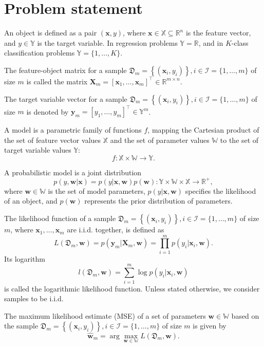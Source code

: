 \documentclass[
11pt,%
tightenlines,%
twoside,%
onecolumn,%
nofloats,%
nobibnotes,%
nofootinbib,%
superscriptaddress,%
noshowpacs,%
centertags]%
{revtex4-2}
\begin{document}
\section{Problem statement}

An object is defined as a pair $(\mathbf{x}, y)$, where $\mathbf{x} \in \mathbb{X} \subseteq \mathbb{R}^n$ is the feature vector, and $y \in \mathbb{Y}$ is the target variable. In regression problems $\mathbb{Y} = \mathbb{R}$, and in $K$-class classification problems $\mathbb{Y} = \{1, \ldots, K\}$.

The feature-object matrix for a sample $\mathfrak{D}_m = \left\{ (\mathbf{x}_i, y_i) \right\}, i \in \mathcal{I} = \{ 1, \ldots, m \}$ of size $m$ is called the matrix $\mathbf{X}_m = \left[ \mathbf{x}_1, \ldots, \mathbf{x}_m \right]^{\top} \in \mathbb{R}^{m \times n}$.

The target variable vector for a sample $\mathfrak{D}_m = \left\{ (\mathbf{x}_i, y_i) \right\}, i \in \mathcal{I} = \{ 1, \ldots, m \}$ of size $m$ is denoted by $\mathbf{y}_m = \left[ y_1, \ldots, y_m \right]^{\top} \in \mathbb{Y}^m$.

A model is a parametric family of functions $f$, mapping the Cartesian product of the set of feature vector values $\mathbb{X}$ and the set of parameter values $\mathbb{W}$ to the set of target variable values $\mathbb{Y}$: 
\[ f: \mathbb{X} \times \mathbb{W} \to \mathbb{Y}. \]

A probabilistic model is a joint distribution
\[ p(y, \mathbf{w} | \mathbf{x}) = p(y | \mathbf{x}, \mathbf{w}) p(\mathbf{w}): \mathbb{Y} \times \mathbb{W} \times \mathbb{X} \to \mathbb{R}^+, \]
where $\mathbf{w} \in \mathbb{W}$ is the set of model parameters, $p(y | \mathbf{x}, \mathbf{w})$ specifies the likelihood of an object, and $p(\mathbf{w})$ represents the prior distribution of parameters.

The likelihood function of a sample $\mathfrak{D}_m = \left\{ (\mathbf{x}_i, y_i) \right\}, i \in \mathcal{I} = \{ 1, \ldots, m \}$ of size $m$, where $\mathbf{x}_1, \ldots, \mathbf{x}_m$ are i.i.d. together, is defined as 
\[ L(\mathfrak{D}_m, \mathbf{w}) = p(\mathbf{y}_m | \mathbf{X}_m, \mathbf{w}) = \prod_{i=1}^{m} p(y_i | \mathbf{x}_i, \mathbf{w}). \]
Its logarithm
\[ l(\mathfrak{D}_m, \mathbf{w}) = \sum\limits_{i=1}^{m} \log p(y_i | \mathbf{x}_i, \mathbf{w}) \]
is called the logarithmic likelihood function. Unless stated otherwise, we consider samples to be i.i.d.

The maximum likelihood estimate (MSE) of a set of parameters $\mathbf{w} \in \mathbb{W}$ based on the sample $\mathfrak{D}_m = \left\{ (\mathbf{x}_i, y_i) \right\}, i \in \mathcal{I} = \{ 1, \ldots, m \}$ of size $m$ is given by 
\[ \hat{\mathbf{w}}_{m} = \arg\max_{\mathbf{w} \in \mathbb{W}} L(\mathfrak{D}_m, \mathbf{w}). \]
\end{document}
